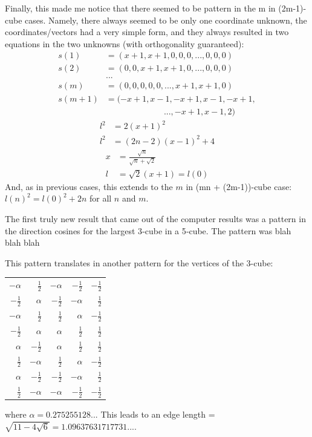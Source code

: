 \documentclass[superscriptaddress,reprint,amsmath,amssymb,aps]{revtex4-1}
\newcommand{\half}{\frac{1}{2}}
\begin{document}
Finally, this made me notice that there seemed to be pattern in the m in
(2m-1)-cube cases.  Namely, there always seemed to be only one
coordinate unknown, the coordinates/vectors had a very simple form, and
they always resulted in two equations in the two unknowns (with
orthogonality guaranteed):
\begin{align*}
     s(1)   & = ( x+1, x+1,    0,   0,    0, ...,    0,   0, 0) \\
     s(2)   & = (   0,   0,  x+1, x+1,    0, ...,    0,   0, 0) \\
            & ...                                               \\
     s(m)   & = (   0,   0,    0,   0,    0, ...,  x+1, x+1, 0) \\
     s(m+1) & = (-x+1, x-1, -x+1, x-1, -x+1,                    \\
            & ~~~~~~~~~~~~~~~~~~~~~~~~~~~~~~~..., -x+1, x-1, 2)
\end{align*}
\begin{align*}
     l^2 & =     2 (x+1)^2     \\
     l^2 & = (2n-2)(x-1)^2 + 4
\end{align*}
\begin{align*}
     x & = \frac{\sqrt{n}}{\sqrt{n}+\sqrt{2}} \\
     l & = \sqrt{2}(x+1) = l(0)
\end{align*}
And, as in previous cases, this extends to the $m$ in (mn + (2m-1))-cube
case:  $l(n)^2 = l(0)^2 + 2n$ for all $n$ and $m$.


The first truly new result that came out of the computer results was a
pattern in the direction cosines for the largest 3‐cube in a 5‐cube.  The
pattern was blah blah blah

This pattern translates in another pattern for the vertices of the 3-cube:
\begin{center}
\renewcommand{\arraystretch}{1.4}
\begin{supertabular}{rrrrr}
    $-\alpha$ & $ \half $ & $-\alpha$ & $-\half $ & $-\half $ \\
    $-\half $ & $ \alpha$ & $-\half $ & $-\alpha$ & $ \half $ \\
    $-\alpha$ & $ \half $ & $ \half $ & $ \alpha$ & $-\half $ \\
    $-\half $ & $ \alpha$ & $ \alpha$ & $ \half $ & $ \half $ \\
    $ \alpha$ & $-\half $ & $ \alpha$ & $ \half $ & $ \half $ \\
    $ \half $ & $-\alpha$ & $ \half $ & $ \alpha$ & $-\half $ \\
    $ \alpha$ & $-\half $ & $-\half $ & $-\alpha$ & $ \half $ \\
    $ \half $ & $-\alpha$ & $-\alpha$ & $-\half $ & $-\half $ \\
\end{supertabular}
\end{center}
where $\alpha = 0.275255128...$
This leads to an edge length = $\sqrt{11 - 4\sqrt{6}} = 1.09637631717731....$
\end{document}
